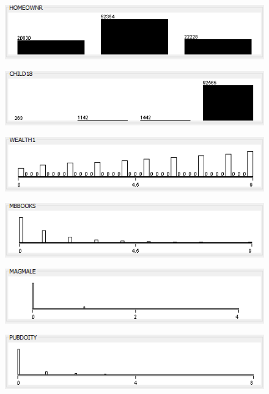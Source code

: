 \begin{figure}
\includegraphics{./images/expl_rep/Cattura-02-04}
\end{figure}
\begin{figure}
\includegraphics{./images/expl_rep/Cattura-02-05}
\end{figure}
\begin{figure}
\includegraphics{./images/expl_rep/Cattura-02-06}
\end{figure}
\begin{figure}
\includegraphics{./images/expl_rep/Cattura-02-07}
\end{figure}
\begin{figure}
\includegraphics{./images/expl_rep/Cattura-02-08}
\end{figure}
\begin{figure}
\includegraphics{./images/expl_rep/Cattura-02-09}
\end{figure}
